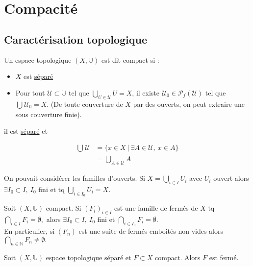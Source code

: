 \section{Compacité}
\subsection{Caractérisation topologique}
\begin{definition}
    Un espace topologique $(X,\mathbb{U})$ est dit compact si :
    \begin{itemize}
        \item $X$ est \underline{séparé}
        \item Pour tout $\mathcal{U}\subset \mathbb{U}$ tel que $\bigcup_{U \in \mathcal{U}}U=X$, il existe $\mathcal{U}_0 \in \mathcal{P}_f(\mathcal{U})$ 
 tel que $\bigcup\limits_{} \mathcal{U}_0=X$. (De toute couverture de $X$ par des ouverts, on peut extraire une sous couverture finie).
    \end{itemize}
    il est \underline{séparé} et 
\end{definition}
\begin{remarque}
    \begin{align*}
        \bigcup\limits_{} \mathcal{U}&=\{x\in X\ |\ \exists A\in \mathcal{U},\ x\in A\}\\
                                     &=\bigcup\limits_{A\in \mathcal{U}} A
     \end{align*}
\end{remarque}
\begin{remarque}
    On pouvait considérer les familles d'ouverts. Si $X=\bigcup\limits_{i\in I} U_i$ avec $U_i$ ouvert alors $\exists I_0\subset I,\ I_0 $ fini et tq $\bigcup\limits_{i\in I_0} U_i=X$.
\end{remarque}
\begin{remarque}
   Soit $(X,\mathbb{U})$ compact. Si $(F_i)_{i\in I}$ est une famille de fermés de $X$ tq $\bigcap\limits_{i\in I} F_i=\emptyset ,$ alors $\exists I_0\subset I,\ I_0$ fini et $\bigcap\limits_{i\in I_0} F_i=\emptyset $.\\
   En particulier, si $(F_n)$ est une suite de fermés emboités non vides alors $\bigcap\limits_{n\in \mathbb{N} } F_n\neq \emptyset .$
\end{remarque}
\begin{lemme}
    Soit $(X,\mathbb{U})$ espace topologique séparé et $F\subset X$ compact. Alors $F$ est fermé.
\end{lemme}
